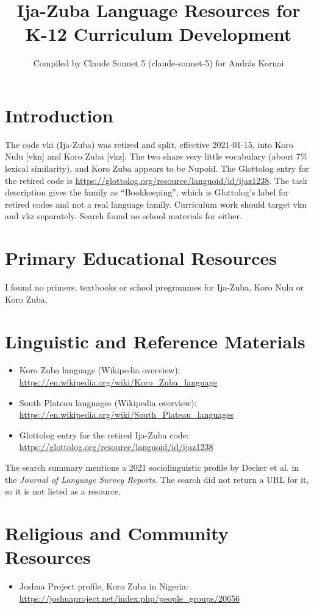 \documentclass[12pt]{article}
\title{Ija-Zuba Language Resources for K-12 Curriculum Development}
\author{Compiled by Claude Sonnet 5 (claude-sonnet-5) for Andr\'as Kornai}
\date{}
\begin{document}
\maketitle

\section{Introduction}
The code vki (Ija-Zuba) was retired and split, effective 2021-01-15, into Koro Nulu [vkn] and Koro Zuba [vkz]. The two share very little vocabulary (about 7\% lexical similarity), and Koro Zuba appears to be Nupoid. The Glottolog entry for the retired code is \url{https://glottolog.org/resource/languoid/id/ijaz1238}. The task description gives the family as ``Bookkeeping'', which is Glottolog's label for retired codes and not a real language family. Curriculum work should target vkn and vkz separately. Search found no school materials for either.

\section{Primary Educational Resources}
I found no primers, textbooks or school programmes for Ija-Zuba, Koro Nulu or Koro Zuba.

\section{Linguistic and Reference Materials}
\begin{itemize}
\item Koro Zuba language (Wikipedia overview): \url{https://en.wikipedia.org/wiki/Koro_Zuba_language}
\item South Plateau languages (Wikipedia overview): \url{https://en.wikipedia.org/wiki/South_Plateau_languages}
\item Glottolog entry for the retired Ija-Zuba code: \url{https://glottolog.org/resource/languoid/id/ijaz1238}
\end{itemize}
The search summary mentions a 2021 sociolinguistic profile by Decker et al. in the \emph{Journal of Language Survey Reports}. The search did not return a URL for it, so it is not listed as a resource.

\section{Religious and Community Resources}
\begin{itemize}
\item Joshua Project profile, Koro Zuba in Nigeria: \url{https://joshuaproject.net/index.php/people_groups/20656}
\end{itemize}
\end{document}
